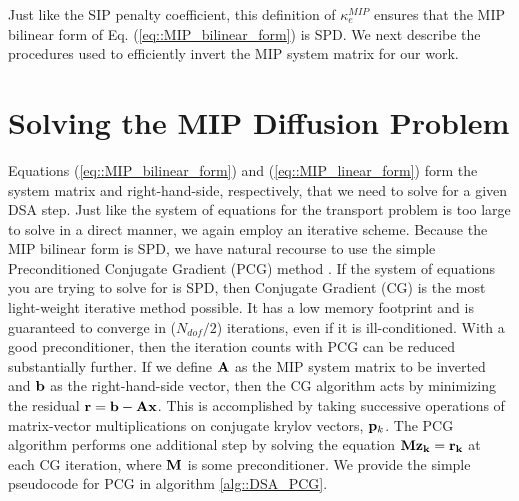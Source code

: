 \noindent Just like the SIP penalty coefficient, this definition of $\kappa_e^{MIP}$ ensures that the MIP bilinear form of Eq. (\ref{eq::MIP_bilinear_form}) is SPD. We next describe the procedures used to efficiently invert the MIP system matrix for our work.

\section{Solving the MIP Diffusion Problem}
\label{sec::DSA_Solving}

Equations (\ref{eq::MIP_bilinear_form}) and (\ref{eq::MIP_linear_form}) form the system matrix and right-hand-side, respectively, that we need to solve for a given DSA step. Just like the system of equations for the transport problem is too large to solve in a direct manner, we again employ an iterative scheme. Because the MIP bilinear form is SPD, we have natural recourse to use the simple Preconditioned Conjugate Gradient (PCG) method \cite{saad2003iterative}. If the system of equations you are trying to solve for is SPD, then Conjugate Gradient (CG) is the most light-weight iterative method possible. It has a low memory footprint and is guaranteed to converge in ($N_{dof}/2$) iterations, even if it is ill-conditioned. With a good preconditioner, then the iteration counts with PCG can be reduced substantially further. If we define ${\bf A}$ as the MIP system matrix to be inverted and ${\bf b}$ as the right-hand-side vector, then the CG algorithm acts by minimizing the residual ${\bf r} = {\bf b} - {\bf A} {\bf x}$. This is accomplished by taking successive operations of matrix-vector multiplications on conjugate krylov vectors, ${\bf p}_k$. The PCG algorithm performs one additional step by solving the equation ${\bf M} {\bf z_k} = {\bf r_k}$ at each CG iteration, where ${\bf M}$ is some preconditioner. We provide the simple pseudocode for PCG in algorithm \ref{alg::DSA_PCG}.

